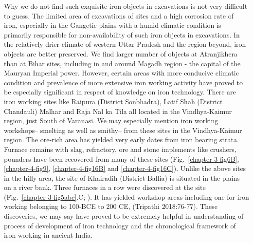 Why we do not find such exquisite iron objects in excavations is not very difficult to guess. The limited area of excavations of sites and a high corrosion rate of iron, especially in the Gangetic plains with a humid climatic condition is primarily responsible for non-availability of such iron objects in excavations. In the relatively drier climate of western Uttar Pradesh and the region beyond, iron objects are better preserved. We find larger number of objects at Atranjikhera than at Bihar sites, including in and around Magadh region - the capital of the Mauryan Imperial power. However, certain areas with more conducive climatic condition and prevalence of more extensive iron working activity have proved to be especially significant in respect of knowledge on iron technology.  There are iron working sites like Raipura (District Sonbhadra), Latif Shah (District Chandauli) Malhar and Raja Nal ka Tila all located in the Vindhya-Kaimur region, just South of Varanasi. We may especially mention iron working workshops– smelting as well as smithy– from these sites in the Vindhya-Kaimur region. The ore-rich area has yielded very early dates from iron bearing strata. Furnace remains with slag, refractory, ore and stone implements like crushers, pounders have been recovered from many of these sites (Fig.~\ref{chapter-3-fig6B}, \ref{chapter-4-fig9}, \ref{chapter-4-fig16B} and \ref{chapter-4-fig16C}). Unlike the above sites in the hilly area, the site of Khairadih (District Ballia) is situated in the plains on a river bank. Three furnaces in a row were discovered at the site (Fig.~\ref{chapter-3-fig5abc}.C; ). It has yielded workshop areas including one for iron working belonging to 100-BCE to 200 CE, (Tripathi 2018:76-77). These discoveries, we may say have proved to be extremely helpful in understanding of process of development of iron technology  and the chronological framework of iron working in ancient India.

